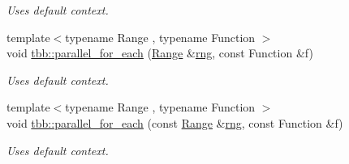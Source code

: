 \begin{DoxyCompactItemize}
\begin{DoxyCompactList}\small\item\em Uses default context. \end{DoxyCompactList}\item 
\hypertarget{group__algorithms_ga5868cd01f2126b139ab5809f64632db1}{}{\footnotesize template$<$typename Range , typename Function $>$ }\\void \hyperlink{group__algorithms_ga5868cd01f2126b139ab5809f64632db1}{tbb\+::parallel\+\_\+for\+\_\+each} (\hyperlink{classtbb_1_1blocked__range}{Range} \&\hyperlink{structrng}{rng}, const Function \&f)\label{group__algorithms_ga5868cd01f2126b139ab5809f64632db1}

\begin{DoxyCompactList}\small\item\em Uses default context. \end{DoxyCompactList}\item 
\hypertarget{group__algorithms_ga33463c8b0d0104cf9d9e0f9cb3c0b26b}{}{\footnotesize template$<$typename Range , typename Function $>$ }\\void \hyperlink{group__algorithms_ga33463c8b0d0104cf9d9e0f9cb3c0b26b}{tbb\+::parallel\+\_\+for\+\_\+each} (const \hyperlink{classtbb_1_1blocked__range}{Range} \&\hyperlink{structrng}{rng}, const Function \&f)\label{group__algorithms_ga33463c8b0d0104cf9d9e0f9cb3c0b26b}

\begin{DoxyCompactList}\small\item\em Uses default context. \end{DoxyCompactList}\end{DoxyCompactItemize}
